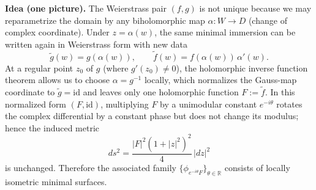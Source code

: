 \documentclass[12pt,a4paper]{article}
\theoremstyle{plain}
\theoremstyle{definition}      %
\begin{document}
	\medskip
	\noindent
	\textbf{Idea (one picture).}
	The Weierstrass pair $(f,g)$ is not unique because we may reparametrize the domain by any biholomorphic map
	$\alpha:W\to D$ (change of complex coordinate). Under $z=\alpha(w)$, the same minimal immersion can be written again in
	Weierstrass form with new data
	\[
	\tilde g(w)=g(\alpha(w)),\qquad \tilde f(w)=f(\alpha(w))\,\alpha'(w).
	\]
	At a regular point $z_0$ of $g$ (where $g'(z_0)\neq 0$), the holomorphic inverse function theorem allows us to choose
	$\alpha=g^{-1}$ locally, which normalizes the Gauss-map coordinate to $\tilde g=\mathrm{id}$ and leaves only one holomorphic
	function $F:=\tilde f$. In this normalized form $(F,\mathrm{id})$, multiplying $F$ by a unimodular constant
	$e^{-i\theta}$ rotates the complex differential by a constant phase but does not change its modulus; hence the induced metric
	\[
	ds^2=\frac{|F|^2(1+|z|^2)^2}{4}\,|dz|^2
	\]
	is unchanged. Therefore the associated family $\{\phi_{e^{-i\theta}F}\}_{\theta\in\mathbb R}$ consists of locally isometric
	minimal surfaces.
	\medskip
\end{document}
